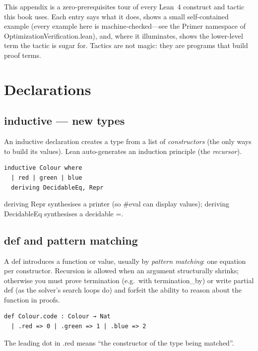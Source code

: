 \documentclass[11pt, a4paper, oneside]{book}
\newcommand{\li}[1]{{\ttfamily\small\color{deepblue}#1}}
\begin{document}
This appendix is a zero-prerequisites tour of every Lean~4 construct and tactic
this book uses.  Each entry says what it does, shows a small self-contained
example (every example here is machine-checked---see the \li{Primer} namespace of
\li{OptimizationVerification.lean}), and, where it illuminates, shows the
lower-level term the tactic is sugar for.  Tactics are not magic: they are
programs that build proof terms.

\section{Declarations}

\subsection*{\li{inductive} --- new types}
An \li{inductive} declaration creates a type from a list of \emph{constructors}
(the only ways to build its values).  Lean auto-generates an induction principle
(the \emph{recursor}).

\begin{leanbox}
\begin{verbatim}
inductive Colour where
  | red | green | blue
  deriving DecidableEq, Repr
\end{verbatim}
\end{leanbox}

\li{deriving Repr} synthesises a printer (so \li{\#eval} can display values);
\li{deriving DecidableEq} synthesises a decidable \li{=}.

\subsection*{\li{def} and pattern matching}
A \li{def} introduces a function or value, usually by \emph{pattern matching}:
one equation per constructor.  Recursion is allowed when an argument
structurally shrinks; otherwise you must prove termination (e.g.\ with
\li{termination\_by}) or write \li{partial def} (as the solver's search loops
do) and forfeit the ability to reason about the function in proofs.

\begin{leanbox}
\begin{verbatim}
def Colour.code : Colour → Nat
  | .red => 0 | .green => 1 | .blue => 2
\end{verbatim}
\end{leanbox}

The leading dot in \li{.red} means ``the constructor of the type being matched''.
\end{document}
